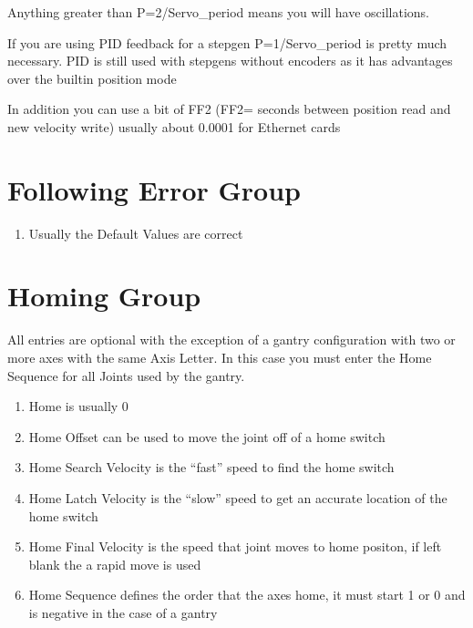 \documentclass[letterpaper,10pt,english,openany,oneside]{sphinxmanual}
\begin{document}
Anything greater than P=2/Servo\_period means you will have oscillations.

If you are using PID feedback for a stepgen P=1/Servo\_period is pretty
much necessary. PID is still used with stepgens without encoders as it
has advantages over the built\sphinxhyphen{}in position mode

In addition you can use a bit of FF2 (FF2= seconds between position read
and new velocity write) usually about 0.0001 for Ethernet cards


\section{Following Error Group}
\label{\detokenize{axes:following-error-group}}\begin{enumerate}
%
\item {} 
Usually the Default Values are correct

\end{enumerate}


\section{Homing Group}
\label{\detokenize{axes:homing-group}}
All entries are optional with the exception of a gantry configuration
with two or more axes with the same Axis Letter. In this case you must
enter the Home Sequence for all Joints used by the gantry.
\begin{enumerate}
%
\item {} 
Home is usually 0

\item {} 
Home Offset can be used to move the joint off of a home switch

\item {} 
Home Search Velocity is the “fast” speed to find the home switch

\item {} 
Home Latch Velocity is the “slow” speed to get an accurate location
of the home switch

\item {} 
Home Final Velocity is the speed that joint moves to home positon,
if left blank the a rapid move is used

\item {} 
Home Sequence defines the order that the axes home, it must start
1 or 0 and is negative in the case of a gantry

\end{enumerate}
\end{document}
